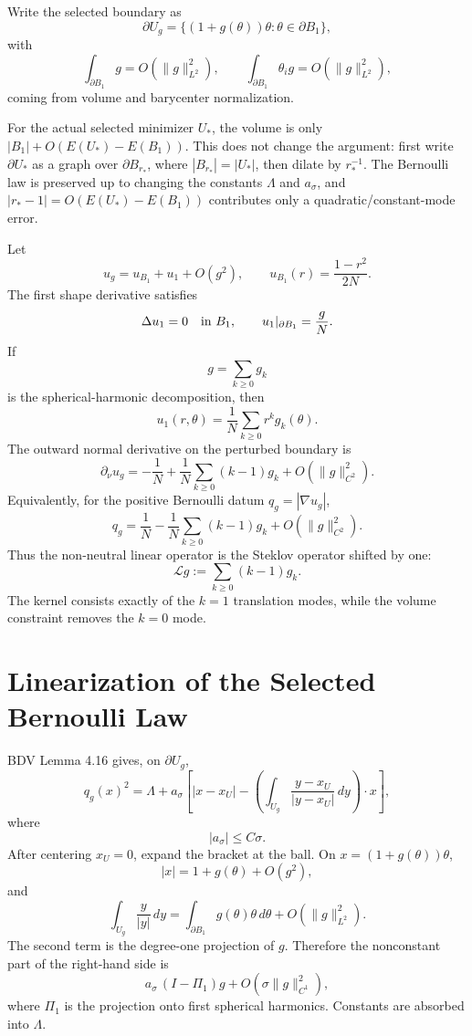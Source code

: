 \documentclass[11pt]{article}
\begin{document}
Write the selected boundary as
\[
\partial U_g=\{(1+g(\theta))\theta:\theta\in\partial B_1\},
\]
with
\[
\int_{\partial B_1}g=O(\|g\|_{L^2}^2),
\qquad
\int_{\partial B_1}\theta_i g=O(\|g\|_{L^2}^2),
\]
coming from volume and barycenter normalization.

For the actual selected minimizer \(U_*\), the volume is only
\(|B_1|+O(E(U_*)-E(B_1))\). This does not change the argument: first write
\(\partial U_*\) as a graph over \(\partial B_{r_*}\), where
\(|B_{r_*}|=|U_*|\), then dilate by \(r_*^{-1}\). The Bernoulli law is
preserved up to changing the constants \(\Lambda\) and \(a_\sigma\), and
\(|r_*-1|=O(E(U_*)-E(B_1))\) contributes only a quadratic/constant-mode error.

Let
\[
u_g=u_{B_1}+u_1+O(g^2),
\qquad
u_{B_1}(r)=\frac{1-r^2}{2N}.
\]
The first shape derivative satisfies
\[
\Delta u_1=0\quad\hbox{in }B_1,
\qquad
u_1|_{\partial B_1}=\frac{g}{N}.
\]
If
\[
g=\sum_{k\ge0}g_k
\]
is the spherical-harmonic decomposition, then
\[
u_1(r,\theta)=\frac1N\sum_{k\ge0} r^k g_k(\theta).
\]
The outward normal derivative on the perturbed boundary is
\[
\partial_\nu u_g
=
-\frac1N
+\frac1N\sum_{k\ge0}(k-1)g_k
+O(\|g\|_{C^2}^2).
\]
Equivalently, for the positive Bernoulli datum \(q_g=|\nabla u_g|\),
\[
q_g
=
\frac1N
-\frac1N\sum_{k\ge0}(k-1)g_k
+O(\|g\|_{C^2}^2).
\]
Thus the non-neutral linear operator is the Steklov operator shifted by one:
\[
\mathcal L g
:=\sum_{k\ge0}(k-1)g_k.
\]
The kernel consists exactly of the \(k=1\) translation modes, while the volume
constraint removes the \(k=0\) mode.

\section{Linearization of the Selected Bernoulli Law}

BDV Lemma 4.16 gives, on \(\partial U_g\),
\[
q_g(x)^2
=
\Lambda
+a_\sigma
\left[
|x-x_U|
-
\left(\int_{U_g}\frac{y-x_U}{|y-x_U|}\,dy\right)\cdot x
\right],
\]
where
\[
|a_\sigma|\le C\sigma.
\]
After centering \(x_U=0\), expand the bracket at the ball. On
\(x=(1+g(\theta))\theta\),
\[
|x|=1+g(\theta)+O(g^2),
\]
and
\[
\int_{U_g}\frac{y}{|y|}\,dy
=
\int_{\partial B_1}g(\theta)\theta\,d\theta
+O(\|g\|_{L^2}^2).
\]
The second term is the degree-one projection of \(g\). Therefore the
nonconstant part of the right-hand side is
\[
a_\sigma\,(I-\Pi_1)g+O(\sigma\|g\|_{C^1}^2),
\]
where \(\Pi_1\) is the projection onto first spherical harmonics. Constants are
absorbed into \(\Lambda\).
\end{document}
